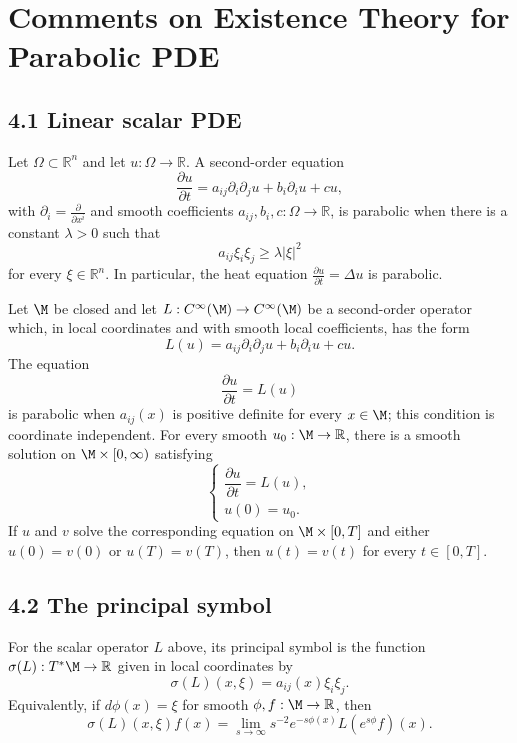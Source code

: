 \chapter{Comments on Existence Theory for Parabolic PDE}

\section*{4.1 \quad Linear scalar PDE}

Let $\Omega\subset\mathbb R^n$ and let $u:\Omega\to\mathbb R$. A second-order
equation
\[
\frac{\partial u}{\partial t}
 =a_{ij}\partial_i\partial_j u+b_i\partial_i u+cu,
\tag{4.1.1}
\]
with $\partial_i=\frac{\partial}{\partial x^i}$ and smooth coefficients
$a_{ij},b_i,c:\Omega\to\mathbb R$, is parabolic when there is a constant
$\lambda>0$ such that
\[
a_{ij}\xi_i\xi_j\geq\lambda\lvert\xi\rvert^2
\tag{4.1.2}
\]
for every $\xi\in\mathbb R^n$. In particular, the heat equation
$\frac{\partial u}{\partial t}=\Delta u$ is parabolic.

Let $\M$ be closed and let $L:C^\infty(\M)\to C^\infty(\M)$ be a second-order
operator which, in local coordinates and with smooth local coefficients, has the form
\[
L(u)=a_{ij}\partial_i\partial_j u+b_i\partial_i u+cu.
\]
The equation
\[
\frac{\partial u}{\partial t}=L(u)
\tag{4.1.3}
\]
is parabolic when $a_{ij}(x)$ is positive definite for every $x\in\M$; this
condition is coordinate independent. For every smooth $u_0:\M\to\mathbb R$,
there is a smooth solution on $\M\times[0,\infty)$ satisfying
\[
\begin{cases}
\dfrac{\partial u}{\partial t}=L(u),\\
u(0)=u_0.
\end{cases}
\]
If $u$ and $v$ solve the corresponding equation on $\M\times[0,T]$ and either
$u(0)=v(0)$ or $u(T)=v(T)$, then $u(t)=v(t)$ for every $t\in[0,T]$.

\section*{4.2 \quad The principal symbol}

\begin{definition}
\label{topping-pde-principal-symbol-scalar}

For the scalar operator $L$ above, its principal symbol is the function
$\sigma(L):T^*\M\to\mathbb R$ given in local coordinates by
\[
\sigma(L)(x,\xi)=a_{ij}(x)\xi_i\xi_j.
\]
Equivalently, if $d\phi(x)=\xi$ for smooth $\phi,f:\M\to\mathbb R$, then
\[
\sigma(L)(x,\xi)f(x)
 =\lim_{s\to\infty}s^{-2}e^{-s\phi(x)}L(e^{s\phi}f)(x).
\tag{4.2.2}
\]
\end{definition}

